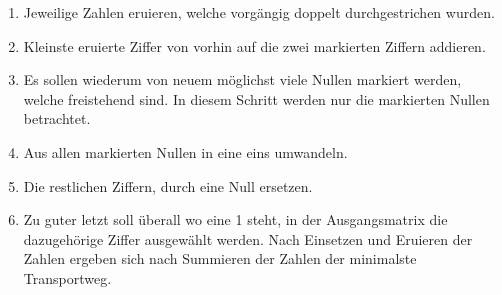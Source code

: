 \begin{enumerate}
\item Jeweilige Zahlen eruieren, welche vorgängig doppelt durchgestrichen wurden.

\item Kleinste eruierte Ziffer von vorhin auf die zwei markierten Ziffern addieren.

\item Es sollen wiederum von neuem möglichst viele Nullen markiert werden,
welche freistehend sind. In diesem Schritt werden nur die markierten Nullen betrachtet.

\item Aus allen markierten Nullen in eine eins umwandeln.

\item Die restlichen Ziffern, durch eine Null ersetzen.

\item Zu guter letzt soll überall wo eine 1 steht, in der Ausgangsmatrix die
dazugehörige Ziffer ausgewählt werden. Nach Einsetzen und Eruieren der Zahlen ergeben sich nach Summieren der Zahlen der minimalste Transportweg.
\end{enumerate}

